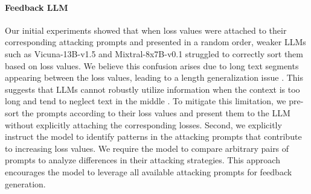 \paragraph{Feedback LLM} Our initial experiments showed that when loss values were attached to their corresponding attacking prompts and presented in a random order, weaker LLMs such as Vicuna-13B-v1.5 and Mixtral-8x7B-v0.1 struggled to correctly sort them based on loss values. We believe this confusion arises due to long text segments appearing between the loss values, leading to a length generalization issue \cite{liu2023lostmiddlelanguagemodels,anil2022exploringlengthgeneralizationlarge}. This suggests that LLMs cannot robustly utilize information when the context is too long and tend to neglect text in the middle \cite{liu2023lostmiddlelanguagemodels}. To mitigate this limitation, we pre-sort the prompts according to their loss values and present them to the LLM without explicitly attaching the corresponding losses. Second, we explicitly instruct the model to identify patterns in the attacking prompts that contribute to increasing loss values. We require the model to compare arbitrary pairs of prompts to analyze differences in their attacking strategies. This approach encourages the model to leverage all available attacking prompts for feedback generation.

